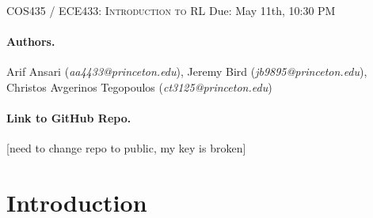 \documentclass{article}
\begin{document}
\newcommand{\lectureTitle}{Optimal Option Pricing and Hedging}
\newcommand{\lectureDate}{Due: May 11th, 10:30 PM}

\textsc{COS435 / ECE433: Introduction to RL} 
\vspace{1em} \hfill \lectureDate

\maketitle

\paragraph{Authors.} Arif Ansari (\textit{aa4433@princeton.edu}), Jeremy Bird (\textit{jb9895@princeton.edu}), Christos Avgerinos Tegopoulos (\textit{ct3125@princeton.edu})

\paragraph{Link to GitHub Repo.} [need to change repo to public, my key is broken]

\section{Introduction}
\end{document}
